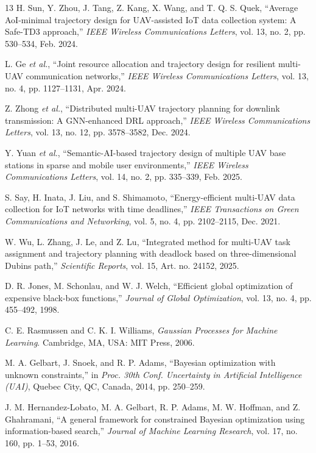 \documentclass[letterpaper,journal]{IEEEtran}
\begin{document}
\begin{thebibliography}{13}
H. Sun, Y. Zhou, J. Tang, Z. Kang, X. Wang, and T. Q. S. Quek, ``Average AoI-minimal trajectory design for UAV-assisted IoT data collection system: A Safe-TD3 approach,'' \emph{IEEE Wireless Communications Letters}, vol. 13, no. 2, pp. 530--534, Feb. 2024.

L. Ge \emph{et al.}, ``Joint resource allocation and trajectory design for resilient multi-UAV communication networks,'' \emph{IEEE Wireless Communications Letters}, vol. 13, no. 4, pp. 1127--1131, Apr. 2024.

Z. Zhong \emph{et al.}, ``Distributed multi-UAV trajectory planning for downlink transmission: A GNN-enhanced DRL approach,'' \emph{IEEE Wireless Communications Letters}, vol. 13, no. 12, pp. 3578--3582, Dec. 2024.

Y. Yuan \emph{et al.}, ``Semantic-AI-based trajectory design of multiple UAV base stations in sparse and mobile user environments,'' \emph{IEEE Wireless Communications Letters}, vol. 14, no. 2, pp. 335--339, Feb. 2025.

S. Say, H. Inata, J. Liu, and S. Shimamoto, ``Energy-efficient multi-UAV data collection for IoT networks with time deadlines,'' \emph{IEEE Transactions on Green Communications and Networking}, vol. 5, no. 4, pp. 2102--2115, Dec. 2021.

W. Wu, L. Zhang, J. Le, and Z. Lu, ``Integrated method for multi-UAV task assignment and trajectory planning with deadlock based on three-dimensional Dubins path,'' \emph{Scientific Reports}, vol. 15, Art. no. 24152, 2025.

D. R. Jones, M. Schonlau, and W. J. Welch, ``Efficient global optimization of expensive black-box functions,'' \emph{Journal of Global Optimization}, vol. 13, no. 4, pp. 455--492, 1998.

C. E. Rasmussen and C. K. I. Williams, \emph{Gaussian Processes for Machine Learning}. Cambridge, MA, USA: MIT Press, 2006.

M. A. Gelbart, J. Snoek, and R. P. Adams, ``Bayesian optimization with unknown constraints,'' in \emph{Proc. 30th Conf. Uncertainty in Artificial Intelligence (UAI)}, Quebec City, QC, Canada, 2014, pp. 250--259.

J. M. Hernandez-Lobato, M. A. Gelbart, R. P. Adams, M. W. Hoffman, and Z. Ghahramani, ``A general framework for constrained Bayesian optimization using information-based search,'' \emph{Journal of Machine Learning Research}, vol. 17, no. 160, pp. 1--53, 2016.


\end{thebibliography}
\end{document}
